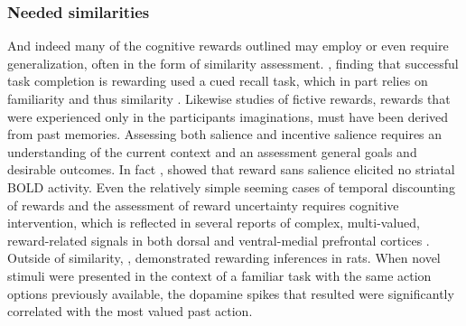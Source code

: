 \documentclass[doc,12pt]{apa}        %
\begin{document}
\subsubsection{Needed similarities}
\label{subsub:needed}
And indeed many of the cognitive rewards outlined may employ or even require generalization, often in the form of similarity assessment.  , finding that successful task completion is rewarding used a cued recall task, which in part relies on familiarity \cite{Jacoby:1991p9096} and thus similarity \cite{Nosofsky:1988p9098}.  Likewise  studies of fictive rewards, rewards that were experienced only in the participants imaginations, must have been derived from past memories.  Assessing both salience and incentive salience requires an understanding of the current context and an assessment general goals and desirable outcomes.  In fact , showed that reward sans salience elicited no striatal BOLD activity.  Even the relatively simple seeming cases of temporal discounting of rewards and the assessment of reward uncertainty requires cognitive intervention, which is reflected in several reports of complex, multi-valued, reward-related signals in both dorsal and ventral-medial prefrontal cortices \cite{Tobler:2009p8302,Wallis:2010p8303,Kim:2009p8304,Seymour:2008p6518}.  Outside of similarity, , demonstrated rewarding inferences in rats. When novel stimuli were presented in the context of a familiar task with the same action options previously available, the dopamine spikes that resulted were significantly correlated with the most valued past action.
\end{document}
